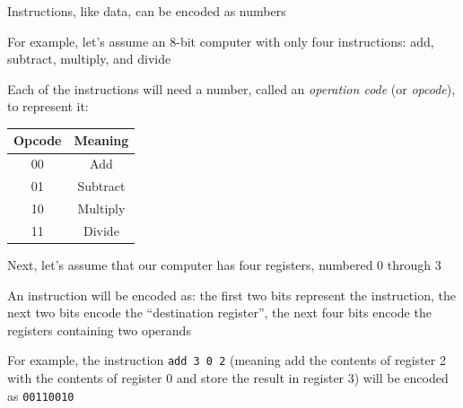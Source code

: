 \documentclass[8pt,a4paper,compress]{beamer}
\begin{document}
\begin{frame}[fragile]
Instructions, like data, can be encoded as numbers

\bigskip

For example, let's assume an 8-bit computer with only four instructions: add, subtract, multiply, and divide

\bigskip

Each of the instructions will need a number, called an \emph{operation code} (or \emph{opcode}), to represent it:
\begin{center}
\begin{tabular}{cc}
Opcode & Meaning \\ \hline
00 & Add \\
01 & Subtract \\ 
10 & Multiply \\
11 & Divide
\end{tabular}
\end{center}

\bigskip

Next, let's assume that our computer has four registers, numbered 0 through 3

\bigskip

An instruction will be encoded as: the first two bits represent the instruction, the next two bits encode the ``destination register'', the next four bits encode the registers containing two operands

\bigskip

For example, the instruction \lstinline{add 3 0 2} (meaning add the contents of register 2 with the contents of register 0 and store the result in register 3) will be encoded as \lstinline{00110010}
\end{frame}
\end{document}

